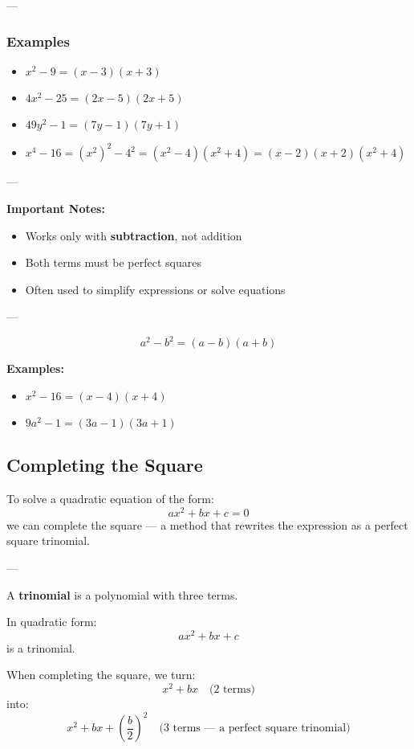 \documentclass[11pt]{article}
\begin{document}
---

\subsubsection*{Examples}

\begin{itemize}
  \item \( x^2 - 9 = (x - 3)(x + 3) \)
  \item \( 4x^2 - 25 = (2x - 5)(2x + 5) \)
  \item \( 49y^2 - 1 = (7y - 1)(7y + 1) \)
  \item \(x^4 - 16 = (x^2)^2 - 4^2 = (x^2 - 4)(x^2 + 4) = (x - 2)(x + 2)(x^2 + 4) \)


\end{itemize}

---

\textbf{Important Notes:}
\begin{itemize}
  \item Works only with \textbf{subtraction}, not addition
  \item Both terms must be perfect squares
  \item Often used to simplify expressions or solve equations
\end{itemize}

---

\begin{tcolorbox}[title=Difference of Squares Summary, colback=red!5!white, colframe=red!75!black]
\[
a^2 - b^2 = (a - b)(a + b)
\]

\textbf{Examples:}
\begin{itemize}
  \item \( x^2 - 16 = (x - 4)(x + 4) \)
  \item \( 9a^2 - 1 = (3a - 1)(3a + 1) \)
\end{itemize}
\end{tcolorbox}
\subsection{Completing the Square}

To solve a quadratic equation of the form:
\[
ax^2 + bx + c = 0
\]
we can complete the square — a method that rewrites the expression as a perfect square trinomial.

---
\begin{tcolorbox}[title=What is a Trinomial?, colback=green!5!white, colframe=green!70!black]
A \textbf{trinomial} is a polynomial with three terms.

In quadratic form:
\[
ax^2 + bx + c
\]
is a trinomial.

When completing the square, we turn:
\[
x^2 + bx \quad \text{(2 terms)}
\]
into:
\[
x^2 + bx + \left( \frac{b}{2} \right)^2 \quad \text{(3 terms — a perfect square trinomial)}
\]
\end{tcolorbox}
\end{document}
